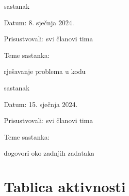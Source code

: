 \begin{packed_enum}
			\item  sastanak
			\item[] \begin{packed_item}
				\item Datum: 8. sječnja 2024.
				\item Prisustvovali: svi članovi tima
				\item Teme sastanka:
				\begin{packed_item}
					\item rješavanje problema u kodu
				\end{packed_item}
			\end{packed_item}
			
			\item  sastanak
			\item[] \begin{packed_item}
				\item Datum: 15. sječnja 2024.
				\item Prisustvovali: svi članovi tima
				\item Teme sastanka:
				\begin{packed_item}
					\item dogovori oko zadnjih zadataka
				\end{packed_item}
			\end{packed_item}
			
			
		\end{packed_enum}
		
		\eject
		\section*{Tablica aktivnosti}
		
			

